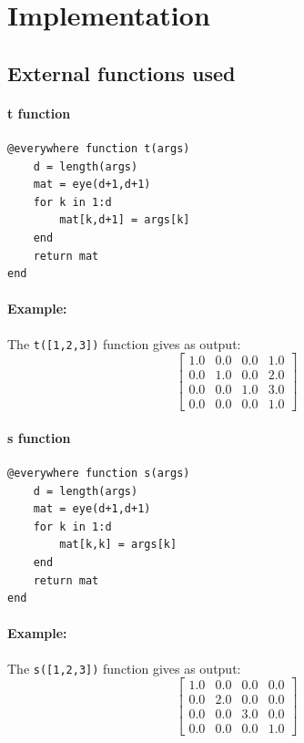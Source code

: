 \documentclass{article}
\begin{document}
\newpage
\section{Implementation}

\subsection{External functions used}

\paragraph{t function}

\begin{verbatim}
@everywhere function t(args)
    d = length(args)
    mat = eye(d+1,d+1)
    for k in 1:d
        mat[k,d+1] = args[k]
    end
    return mat
end
\end{verbatim}

\paragraph{Example:}
The \verb!t([1,2,3])! function gives as output:
\[
\begin{bmatrix}
1.0 & 0.0 & 0.0 & 1.0 \\
0.0 & 1.0 & 0.0 & 2.0 \\
0.0 & 0.0 & 1.0 & 3.0 \\
0.0 & 0.0 & 0.0 & 1.0
\end{bmatrix}
\]

\paragraph{s function}

\begin{verbatim}
@everywhere function s(args)
    d = length(args)
    mat = eye(d+1,d+1)
    for k in 1:d
        mat[k,k] = args[k]
    end
    return mat
end
\end{verbatim}

\paragraph{Example:}
The \verb!s([1,2,3])! function gives as output:
\[
\begin{bmatrix}
1.0 & 0.0 & 0.0 & 0.0 \\
0.0 & 2.0 & 0.0 & 0.0 \\
0.0 & 0.0 & 3.0 & 0.0 \\
0.0 & 0.0 & 0.0 & 1.0
\end{bmatrix}
\]
\end{document}
